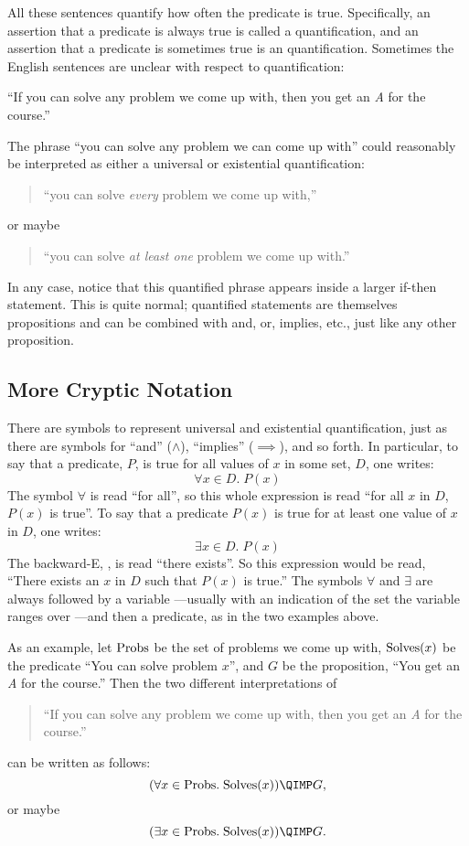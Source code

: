 All these sentences quantify how often the predicate is true.
Specifically, an assertion that a predicate is always true is called a
 quantification, and an assertion that a predicate is
sometimes true is an  quantification.  Sometimes the
English sentences are unclear with respect to quantification:
%
\begin{center}
  ``If you can solve any problem we come up with, then you get an \emph{A}
  for the course.''
\end{center}
%
The phrase ``you can solve any problem we can come up with'' could
reasonably be interpreted as either a universal or existential
quantification:
%
\begin{quote}
``you can solve \emph{every} problem we come up with,''
\end{quote}
or maybe
\begin{quote}
``you can solve \emph{at least one} problem we come up with.''
\end{quote}
%
In any case, notice that this quantified phrase appears inside a
larger if-then statement.  This is quite normal; quantified statements
are themselves propositions and can be combined with and, or, implies,
etc., just like any other proposition.

\subsection{More Cryptic Notation}

There are symbols to represent universal and existential
quantification, just as there are symbols for ``and'' ($\wedge$),
``implies'' ($\implies$), and so forth.  In particular, to say that a
predicate, $P$, is true for all values of $x$ in some set, $D$, one
writes:
%
\[
\forall x \in D.\; P(x)
\]
%
The symbol $\forall$ is read ``for all'', so this whole expression is
read ``for all $x$ in $D$, $P(x)$ is true''.  To say that a predicate
$P(x)$ is true for at least one value of $x$ in $D$, one writes:
%
\[
\exists x \in D.\; P(x)
\]
%
The backward-E, \term{$\exists$}, is read ``there exists''.  So this
expression would be read, ``There exists an $x$ in $D$ such that $P(x)$ is
true.''  The symbols $\forall$ and $\exists$ are always followed by a
variable ---usually with an indication of the set the variable ranges over
---and then a predicate, as in the two examples above.

As an example, let $\text{Probs}$ be the set of problems we come up with,
$\text{Solves}(x)$ be the predicate ``You can solve problem $x$'', and $G$ be
the proposition, ``You get an \emph{A} for the course.''  Then the two
different interpretations of
%
\begin{quote}
  ``If you can solve any problem we come up with, then you get an \emph{A}
  for the course.''
\end{quote}
%
can be written as follows:
%
\[
(\forall x \in \probs.\; \solves(x)) \QIMP G,
\]
or maybe
\[
(\exists x \in \probs.\; \solves(x)) \QIMP G.
\]

